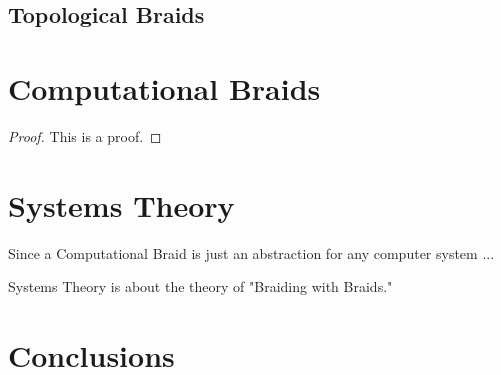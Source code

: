 \documentclass[english, twocolumn]{article}
\begin{document}
\subsection{Topological Braids}

\section{Computational Braids}

\begin{proof}
	This is a proof.
\end{proof}

\section{Systems Theory}

Since a Computational Braid is just an abstraction for any computer system ...

Systems Theory is about the theory of "Braiding with Braids."

\section{Conclusions}
\end{document}
